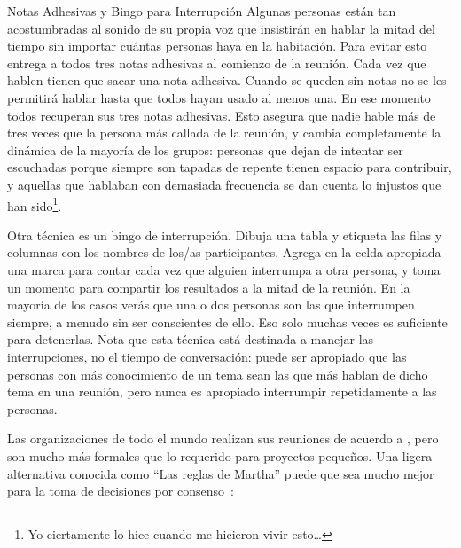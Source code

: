 \begin{aside}{Notas Adhesivas y Bingo para Interrupción}
  Algunas personas están tan acostumbradas al sonido de su propia voz
  que insistirán en hablar la mitad del tiempo
  sin importar cuántas personas haya en la habitación.
  Para evitar esto
  entrega a todos tres notas adhesivas al comienzo de la reunión.
  Cada vez que hablen
  tienen que sacar una nota adhesiva.
  Cuando se queden sin notas
  no se les permitirá hablar hasta que todos hayan usado al menos una.
  En ese momento todos recuperan sus tres notas adhesivas.
  Esto asegura que nadie hable más de tres veces que
  la persona más callada de la reunión,
  y cambia completamente la dinámica de la mayoría de los grupos:
  personas que dejan de intentar ser escuchadas porque siempre son tapadas
  de repente tienen espacio para contribuir,
  y aquellas que hablaban con demasiada frecuencia se dan cuenta lo injustos que han sido\footnote{
    Yo ciertamente lo hice cuando me hicieron vivir esto{\ldots}
  }.

  Otra técnica es un bingo de interrupción.
  Dibuja una tabla y etiqueta las filas y columnas con los nombres de los/as participantes.
  Agrega en la celda apropiada una marca para contar 
  cada vez que alguien interrumpa a otra persona,
  y toma un momento para compartir los resultados a la mitad de la reunión.
  En la mayoría de los casos
  verás que una o dos personas son las que interrumpen siempre,
  a menudo sin ser conscientes de ello.
  Eso solo muchas veces es suficiente para detenerlas.
  Nota que esta técnica está destinada a manejar las interrupciones,
  no el tiempo de conversación:
  puede ser apropiado que las personas con más conocimiento de un tema 
  sean las que más hablan de dicho tema en una reunión,
  pero nunca es apropiado interrumpir repetidamente a las personas.
\end{aside}


Las organizaciones de todo el mundo realizan sus reuniones de acuerdo a 
,
pero son mucho más formales que lo requerido para proyectos pequeños.
Una ligera alternativa conocida como ``Las reglas de Martha''
puede que sea mucho mejor para la toma de decisiones por consenso~\cite{Mina1986}:

